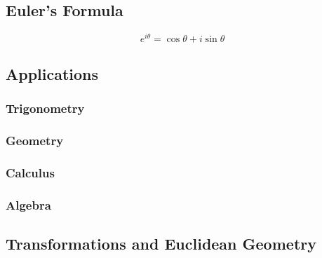 \begin{card}
\subsection{Euler's Formula}
$$e ^ {i \theta} = \cos \theta + i \sin \theta$$
\end{card}

\subsection{Applications}
\subsubsection{Trigonometry}
\subsubsection{Geometry}
\subsubsection{Calculus}
\subsubsection{Algebra}

\subsection{Transformations and Euclidean Geometry}
